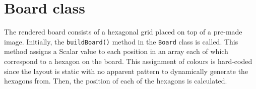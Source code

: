 \section{Board class}
The rendered board consists of a hexagonal grid placed on top of a pre-made image.  Initially, the \texttt{buildBoard()} method in the \texttt{Board} class is called. This method assigns a Scalar value to each position in an array each of which correspond to a hexagon on the board. This assignment of colours is hard-coded since the layout is static with no apparent pattern to dynamically generate the hexagons from. Then, the position of each of the hexagons is calculated.